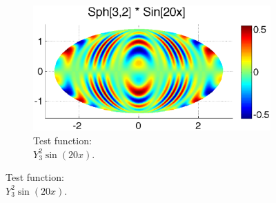 \begin{figure}
\begin{center}
	\centering
	\begin{subfigure}[t]{0.48\textwidth}
	\centering
	\includegraphics[width=1.0\textwidth]{../figures/appendices/direct_vs_indirect_weights/compare_weight_generation/xsfc_vs_xsfc_alt_on_sph32_times_sine_20x/sph32_times_sin20x.eps}
	\caption{Test function:  \\ $Y_{3}^{2} \sin(20 x) $.  }
		\label{fig:direct_vs_indirect_manufactured_base}
	\end{subfigure}
	

\end{center}
\end{figure}
